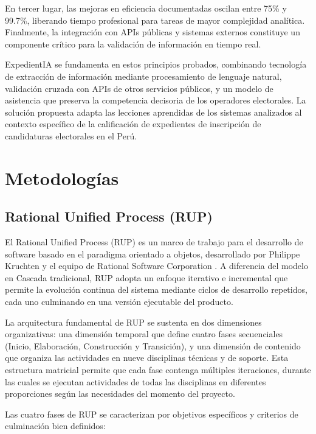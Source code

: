 \documentclass[12pt,a4paper,oneside]{book}
\begin{document}
En tercer lugar, las mejoras en eficiencia documentadas oscilan entre 75\% y 99.7\%, liberando tiempo profesional para tareas de mayor complejidad analítica. Finalmente, la integración con APIs públicas y sistemas externos constituye un componente crítico para la validación de información en tiempo real.

ExpedientIA se fundamenta en estos principios probados, combinando tecnología de extracción de información mediante procesamiento de lenguaje natural, validación cruzada con APIs de otros servicios públicos, y un modelo de asistencia que preserva la competencia decisoria de los operadores electorales. La solución propuesta adapta las lecciones aprendidas de los sistemas analizados al contexto específico de la calificación de expedientes de inscripción de candidaturas electorales en el Perú.

\section{Metodologías}
\label{sec:metodologias}

\subsection{Rational Unified Process (RUP)}
\label{subsec:rup}

El Rational Unified Process (RUP) es un marco de trabajo para el desarrollo de software basado en el paradigma orientado a objetos, desarrollado por Philippe Kruchten y el equipo de Rational Software Corporation \cite{kruchten2003rup}. A diferencia del modelo en Cascada tradicional, RUP adopta un enfoque iterativo e incremental que permite la evolución continua del sistema mediante ciclos de desarrollo repetidos, cada uno culminando en una versión ejecutable del producto.

La arquitectura fundamental de RUP se sustenta en dos dimensiones organizativas: una dimensión temporal que define cuatro fases secuenciales (Inicio, Elaboración, Construcción y Transición), y una dimensión de contenido que organiza las actividades en nueve disciplinas técnicas y de soporte. Esta estructura matricial permite que cada fase contenga múltiples iteraciones, durante las cuales se ejecutan actividades de todas las disciplinas en diferentes proporciones según las necesidades del momento del proyecto.

Las cuatro fases de RUP se caracterizan por objetivos específicos y criterios de culminación bien definidos:
\end{document}
